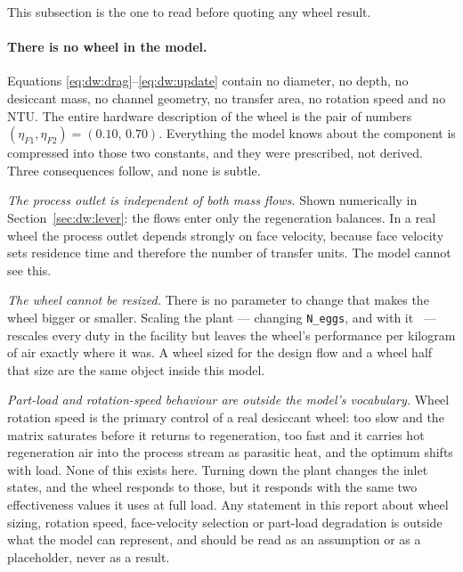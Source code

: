 This subsection is the one to read before quoting any wheel result.

\paragraph{There is no wheel in the model.} Equations
\eqref{eq:dw:drag}--\eqref{eq:dw:update} contain no diameter, no depth, no
desiccant mass, no channel geometry, no transfer area, no rotation speed and
no NTU. The entire hardware description of the wheel is the pair of numbers
$(\eta_{F1},\eta_{F2}) = (0.10,\,0.70)$. Everything the model knows about the
component is compressed into those two constants, and they were prescribed,
not derived. Three consequences follow, and none is subtle.

\emph{The process outlet is independent of both mass flows.} Shown
numerically in Section~\ref{sec:dw:lever}: the flows enter only the
regeneration balances. In a real wheel the process outlet depends strongly on
face velocity, because face velocity sets residence time and therefore the
number of transfer units. The model cannot see this.

\emph{The wheel cannot be resized.} There is no parameter to change that
makes the wheel bigger or smaller. Scaling the plant --- changing
\texttt{N\_eggs}, and with it \mdp\ --- rescales every duty in the facility
but leaves the wheel's performance per kilogram of air exactly where it was.
A wheel sized for the design flow and a wheel half that size are the same
object inside this model.

\emph{Part-load and rotation-speed behaviour are outside the model's
vocabulary.} Wheel rotation speed is the primary control of a real desiccant
wheel: too slow and the matrix saturates before it returns to regeneration,
too fast and it carries hot regeneration air into the process stream as
parasitic heat, and the optimum shifts with load. None of this exists here.
Turning down the plant changes the inlet states, and the wheel responds to
those, but it responds with the same two effectiveness values it uses at full
load. Any statement in this report about wheel sizing, rotation speed,
face-velocity selection or part-load degradation is outside what the model can
represent, and should be read as an assumption or as a placeholder, never as
a result.

